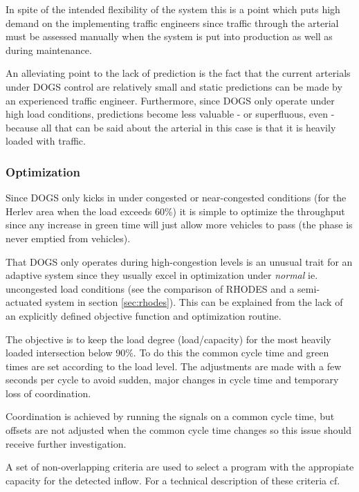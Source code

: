 In spite of the intended flexibility of the system this is a point
which puts high demand on the implementing traffic engineers since
traffic through the arterial must be assessed manually when the system
is put into production as well as during maintenance.

An alleviating point to the lack of prediction is the fact that the
current arterials under DOGS control are relatively small and static
predictions can be made by an experienced traffic
engineer. Furthermore, since DOGS only operate under high load
conditions, predictions become less valuable - or superfluous, even -
because all that can be said about the arterial in this case is that
it is heavily loaded with traffic.

\subsubsection*{Optimization}

Since DOGS only kicks in under congested or near-congested conditions
(for the Herlev area when the load exceeds 60\%) it is simple to
optimize the throughput since any increase in green time will just
allow more vehicles to pass (the phase is never emptied from
vehicles).

That DOGS only operates during high-congestion levels is an unusual trait for an adaptive system since they usually excel in optimization under \textit{normal} ie. uncongested load conditions (see the comparison of RHODES and a semi-actuated system in section \ref{sec:rhodes}). This can be explained from the lack of an explicitly defined objective function and optimization routine.

The objective is to keep the load degree (load/capacity) for the most heavily loaded intersection below 90\%.
To do this the common cycle time and green times are set according to the load level. The adjustments are made with a few seconds per cycle to avoid sudden, major changes in cycle time and temporary loss of coordination.

Coordination is achieved by running the signals on a common cycle time, but offsets are not adjusted when the common cycle time changes so this issue should receive further investigation.

A set of non-overlapping criteria are used to select a program with the appropiate capacity for the detected inflow. For a technical description of these criteria cf. \cite{forprojekt}


